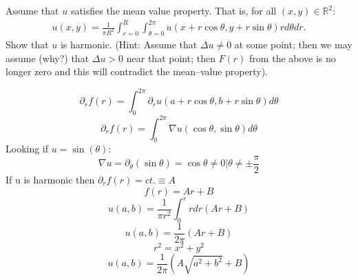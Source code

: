 \documentclass[12pt]{exam}
\newcommand{\R}{\mathbb{R}}
\newcommand{\grad}{\nabla}
\begin{document}
\begin{questions}
\newpage 
\begin{question}
Assume that $u$ satisfies the mean value property. That is, for all $(x,y)\in \R^{2}$: 
\begin{align*}
u(x,y) 
= \frac{1}{\pi R^2}\int_{r=0}^{R}\int_{\theta = 0}^{2\pi}u(x + r\cos\theta, y + r\sin\theta)r d\theta dr. 
\end{align*}
Show that $u$ is harmonic. (Hint: Assume that $\Delta u \neq 0$ at some point; then we may assume (why?) that 
$\Delta u >0$ near that point; then $F(r)$ from the above is no longer zero and this will contradict the 
mean--value property).
\end{question}
\begin{solutionorbox}[\stretch{1}]
\[\partial_r f(r) = \int_0^{2\pi}\partial_r u(a+r\cos\theta,b+r\sin\theta)d\theta\]
\[\partial_r f(r) = \int_0^{2\pi} \grad u(\cos\theta,\sin\theta) d\theta\]
Looking if \(u = \sin(\theta)\):
\[\grad u = \partial_\theta (\sin \theta) = \cos \theta \neq 0| \theta \neq \pm \frac{\pi}{2}\]
If u is harmonic then \(\partial_r f(r) = ct. \equiv A\)
\[f(r) = Ar + B\]
\[u(a,b) = \frac{1}{\pi r^2} \int_0^r r dr(Ar+B)\]
\[u(a,b) = \frac{1}{2\pi}(Ar+B)\]
\[r^2 = x^2+y^2\]
\[u(a,b) = \frac{1}{2\pi}\left(A\sqrt{a^2+b^2}+B\right)\]
\end{solutionorbox}



\end{questions}
\end{document}

